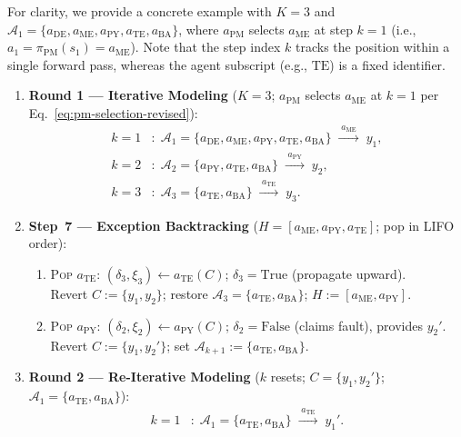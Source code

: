 \documentclass[11pt,a4paper]{article}
\begin{document}
\smallskip
For clarity, we provide a concrete example with $K{=}3$ and $\mathcal{A}_1{=}\{a_{\text{DE}}, a_{\text{ME}}, a_{\text{PY}}, a_{\text{TE}}, a_{\text{BA}}\}$, where $a_{\text{PM}}$ selects $a_{\text{ME}}$ at step $k{=}1$ (i.e., $a_1{=}\pi_{\mathrm{PM}}(s_1){=}a_{\text{ME}}$). Note that the step index $k$ tracks the position within a single forward pass, whereas the agent subscript (e.g., $\text{TE}$) is a fixed identifier.

\medskip
\begin{enumerate}\setlength{\itemsep}{6pt}
\item \textbf{Round 1 --- Iterative Modeling}\; ($K{=}3$; $a_{\text{PM}}$ selects $a_{\text{ME}}$ at $k{=}1$ per Eq.~\eqref{eq:pm-selection-revised}):
\[
\begin{aligned}
k{=}1&:\; \mathcal{A}_1{=}\{a_{\text{DE}}, a_{\text{ME}}, a_{\text{PY}}, a_{\text{TE}}, a_{\text{BA}}\}
\;\xrightarrow{\;a_{\text{ME}}\;}\; y_1,\\
k{=}2&:\; \mathcal{A}_2{=}\{a_{\text{PY}}, a_{\text{TE}}, a_{\text{BA}}\}
\;\xrightarrow{\;a_{\text{PY}}\;}\; y_2,\\
k{=}3&:\; \mathcal{A}_3{=}\{a_{\text{TE}}, a_{\text{BA}}\}
\;\xrightarrow{\;a_{\text{TE}}\;}\; y_3.
\end{aligned}
\]

\item \textbf{Step~7 --- Exception Backtracking}\; ($H=[a_{\text{ME}}, a_{\text{PY}}, a_{\text{TE}}]$; pop in LIFO order):
\begin{enumerate}\small\setlength{\itemsep}{3pt}
\item \textsc{Pop} $a_{\text{TE}}$:\; $(\delta_3,\xi_3)\gets a_{\text{TE}}(C)$;\; $\delta_3{=}\mathrm{True}$ (propagate upward).\\
Revert $C{:=}\{y_1,y_2\}$;\; restore $\mathcal{A}_3{=}\{a_{\text{TE}},a_{\text{BA}}\}$;\; $H{:=}[a_{\text{ME}},a_{\text{PY}}]$.
\item \textsc{Pop} $a_{\text{PY}}$:\; $(\delta_2,\xi_2)\gets a_{\text{PY}}(C)$;\; $\delta_2{=}\mathrm{False}$ (claims fault), provides $y_2'$.\\
Revert $C{:=}\{y_1,y_2'\}$;\; set $\mathcal{A}_{k+1}{:=}\{a_{\text{TE}},a_{\text{BA}}\}$.
\end{enumerate}

\item \textbf{Round 2 --- Re-Iterative Modeling}\; ($k$ resets; $C{=}\{y_1,y_2'\}$; $\mathcal{A}_1{=}\{a_{\text{TE}},a_{\text{BA}}\}$):
\[
\begin{aligned}
k{=}1&:\; \mathcal{A}_1{=}\{a_{\text{TE}}, a_{\text{BA}}\}
\;\xrightarrow{\;a_{\text{TE}}\;}\; y_1'.
\end{aligned}
\]
\end{enumerate}
\end{document}
